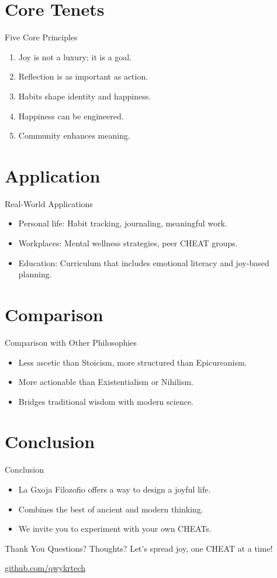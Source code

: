 \documentclass{beamer}
\begin{document}
\section{Core Tenets}
\begin{frame}{Five Core Principles}
\begin{enumerate}
    \item Joy is not a luxury; it is a goal.
    \item Reflection is as important as action.
    \item Habits shape identity and happiness.
    \item Happiness can be engineered.
    \item Community enhances meaning.
\end{enumerate}
\end{frame}

\section{Application}
\begin{frame}{Real-World Applications}
\begin{itemize}
    \item Personal life: Habit tracking, journaling, meaningful work.
    \item Workplaces: Mental wellness strategies, peer CHEAT groups.
    \item Education: Curriculum that includes emotional literacy and joy-based planning.
\end{itemize}
\end{frame}

\section{Comparison}
\begin{frame}{Comparison with Other Philosophies}
\begin{itemize}
    \item Less ascetic than Stoicism, more structured than Epicureanism.
    \item More actionable than Existentialism or Nihilism.
    \item Bridges traditional wisdom with modern science.
\end{itemize}
\end{frame}

\section{Conclusion}
\begin{frame}{Conclusion}
\begin{itemize}
    \item La Gxoja Filozofio offers a way to design a joyful life.
    \item Combines the best of ancient and modern thinking.
    \item We invite you to experiment with your own CHEATs.
\end{itemize}
\end{frame}

\begin{frame}{Thank You}
\centering
Questions? Thoughts? Let’s spread joy, one CHEAT at a time!

\bigskip
\href{https://github.com/qwykrtech}{github.com/qwykrtech}
\end{frame}
\end{document}
